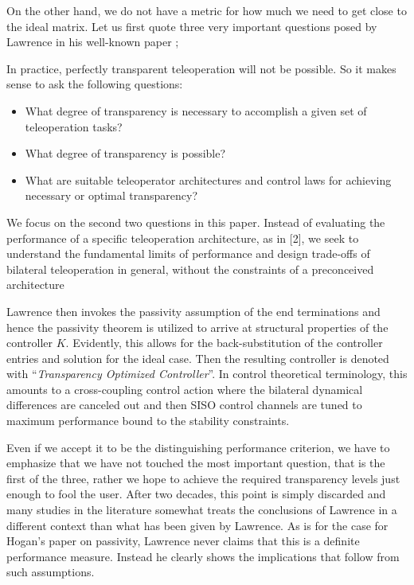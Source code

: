 On the other hand, we do not have a metric for how much we need to get close to the ideal matrix. Let us first quote three 
very important questions posed by Lawrence in his well-known paper \cite{lawrence};
\begin{displayquote}
In practice, perfectly transparent teleoperation will not be possible. So it makes sense to ask the following questions:
\begin{itemize}
	\item What degree of transparency is necessary to accomplish a given set of teleoperation tasks? 
	\item What degree of transparency is possible?
	\item What are suitable teleoperator architectures and control laws for achieving necessary or optimal transparency?
\end{itemize}
We focus on the second two questions in this paper. Instead of evaluating the performance of a specific teleoperation architecture,
as in [2], we seek to understand the fundamental limits of performance and design trade-offs of bilateral teleoperation in
general, without the constraints of a preconceived architecture
\end{displayquote}
Lawrence then invokes the passivity assumption of the end terminations and hence the passivity theorem is utilized to arrive at structural 
properties of the controller $K$. Evidently, this allows for the back-substitution of the controller entries and solution
for the ideal case. Then the resulting controller is denoted with \enquote{\emph{Transparency Optimized Controller}}. In 
control theoretical terminology, this amounts to a cross-coupling control action where the bilateral dynamical differences
are canceled out and then SISO control channels are tuned to maximum performance bound to the stability constraints. 


Even if we accept it to be the distinguishing performance criterion, we have to emphasize that we have not touched the most 
important question, that is the first of the three, rather we hope to achieve the required transparency levels just enough 
to fool the user. After two decades, this point is simply discarded and many studies in the literature somewhat 
treats the conclusions of Lawrence in a different context than what has been given by Lawrence. As is for the case for 
Hogan's paper on passivity, Lawrence never claims that this is a definite performance measure. Instead he clearly shows the 
implications that follow from such assumptions. 


